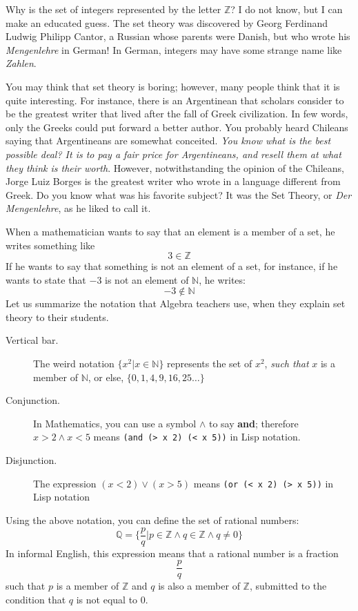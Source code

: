 \documentclass[a4paper,12pt]{book}
\begin{document}

Why is the set of integers represented by the letter $\mathbb{Z}$? I do not know,
but I can make an educated guess. The set theory was discovered by Georg Ferdinand
Ludwig Philipp Cantor, a Russian whose parents were Danish, but who  wrote
his {\em Mengenlehre} in German! In German, integers may have some strange name like {\em Zahlen}.


You may think that set theory is boring; however, many people think that it is quite interesting. For instance, there is an Argentinean that scholars consider to be the greatest writer that lived after the fall of Greek civilization. In few words, only the Greeks could put forward a better author. You probably heard Chileans saying  that Argentineans are somewhat conceited. {\em You know what is the best possible deal? It is to pay a fair price for Argentineans, and resell them at what they think is their worth}. However, notwithstanding the opinion of the Chileans, Jorge Luiz Borges is the greatest writer who wrote in a language different from Greek.
Do you know what was his favorite subject? It was the Set Theory, or {\em Der Mengenlehre}, as he liked to call it.

When a mathematician wants to say that an element is a member of a set, he writes something like
$$3  \in \mathbb{Z}$$
If he wants to say that something is not an element of a set, for instance, if he wants to state that $-3$ is not an element of $\mathbb{N}$, he writes:
$$-3  \notin  \mathbb{N}$$
Let us summarize the notation that Algebra teachers use, when they explain set theory to their students.
\begin{description}
\item[Vertical bar.] The weird notation $\{x^2 | x \in \mathbb{N}\}$
represents the set of
$x^2$, {\em such that} $x$ is a member of $\mathbb{N}$, or else,
$\{0, 1, 4, 9, 16, 25\ldots\}$
\item[Conjunction.] In Mathematics, you can use a symbol $\wedge$
to say {\bf\small and}; therefore $x>2 \wedge x<5$ means 
\verb|(and (> x 2) (< x 5))| in Lisp notation.
\item[Disjunction.] The expression
$(x<2) \vee (x>5)$
means \verb|(or (< x 2) (> x 5))| in Lisp notation
\end{description}
Using the above notation, you can define the set of rational numbers:
$$\mathbb{Q}=\{\frac{p}{q} | p \in \mathbb{Z} \wedge q \in \mathbb{Z} 
\wedge q \neq 0\}$$
In informal English, this expression means that a rational number is a fraction $$\frac{p}{q}$$ such that $p$ is a member of $\mathbb{Z}$ and $q$ is also a member of $\mathbb{Z}$, submitted to the condition that $q$ is not equal to $0$.
\end{document}
